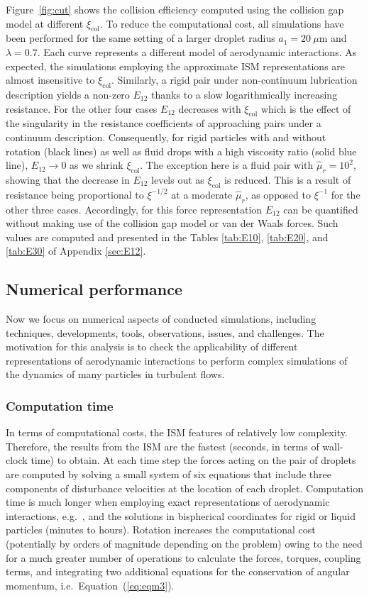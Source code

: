 \documentclass[../thesis.tex]{subfiles}
\begin{document}
Figure~\ref{fig:cut} shows the collision efficiency computed using the collision gap model at different $\xi_\text{col}$. To reduce the computational cost, all simulations have been performed for the same setting of a larger droplet radius $a_1 = 20~\mu$m and $\lambda=0.7$. Each curve represents a different model of aerodynamic interactions. As expected, the simulations employing the approximate ISM representations are almost insensitive to $\xi_\text{col}$. Similarly, a rigid pair under non-continuum lubrication description yields a non-zero $E_{12}$ thanks to a slow logarithmically increasing resistance. For the other four cases $E_{12}$ decreases with $\xi_\text{col}$ which is the effect of the singularity in the resistance coefficients of approaching pairs under a continuum description. Consequently, for rigid particles with and without rotation (black lines) as well as fluid drops with a high viscosity ratio (solid blue line), $E_{12} \to 0$ as we shrink $\xi_\text{col}$. The exception here is a fluid pair with $\hat{\mu}_r=10^2$, showing that the decrease in $E_{12}$ levels out as $\xi_\text{col}$ is reduced. This is a result of resistance being proportional to $\xi^{-1/2}$ at a moderate $\hat{\mu}_r$, as opposed to $\xi^{-1}$ for the other three cases. Accordingly, for this force representation $E_{12}$ can be quantified without making use of the collision gap model or van der Waals forces. Such values are computed and presented in the Tables \ref{tab:E10}, \ref{tab:E20}, and \ref{tab:E30} of Appendix \ref{sec:E12}.


\subsection{Numerical performance}
Now we focus on numerical aspects of conducted simulations, including techniques, developments, tools, observations, issues, and challenges.
The motivation for this analysis is to check the applicability of different representations of aerodynamic interactions to perform complex simulations of the dynamics of many particles in turbulent flows.

\subsubsection{Computation time}
In terms of computational costs, the ISM features of relatively low complexity. Therefore, the results from the ISM are the fastest (seconds, in terms of wall-clock time) to obtain. At each time step the forces acting on the pair of droplets are computed by solving a small system of six equations that include three components of disturbance velocities at the location of each droplet. Computation time is much longer when employing exact representations of aerodynamic interactions, e.g.\ \cite{JO84}, and the solutions in bispherical coordinates for rigid \citep{SJ26,ONM70} or liquid \citep{HHS73,Z80} particles (minutes to hours). Rotation increases the computational cost (potentially by orders of magnitude depending on the problem) owing to the need for a much greater number of operations to calculate the forces, torques, coupling terms, and integrating two additional equations for the conservation of angular momentum, i.e.\ Equation~(\ref{eq:eqm3}).
\end{document}
